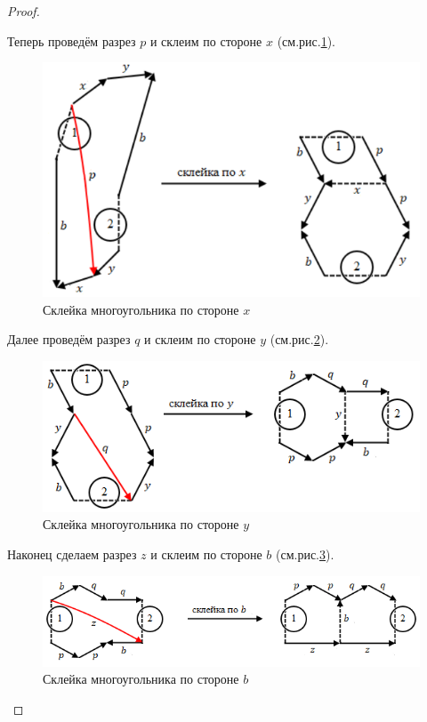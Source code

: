 \begin{proof}
\begin{enumerate}
        Теперь проведём разрез $p$ и склеим по стороне $x$ (см.рис.\ref{fig:c10.11}).

        \begin{figure}[htbp]
            \centering
            \includegraphics[scale=0.7]{images/c10.11.png}
            \caption{Склейка многоугольника по стороне $x$}
            \label{fig:c10.11}
        \end{figure}

        Далее проведём разрез $q$ и склеим по стороне $y$ (см.рис.\ref{fig:c10.12}).

        \begin{figure}[htbp]
            \centering
            \includegraphics[scale=0.7]{images/c10.12.png}
            \caption{Склейка многоугольника по стороне $y$}
            \label{fig:c10.12}
        \end{figure}

        Наконец сделаем разрез $z$ и склеим по стороне $b$ (см.рис.\ref{fig:c10.13}).

        \begin{figure}[htbp]
            \centering
            \includegraphics[scale=0.7]{images/c10.13.png}
            \caption{Склейка многоугольника по стороне $b$}
            \label{fig:c10.13}
        \end{figure}


\end{enumerate}
\end{proof}
